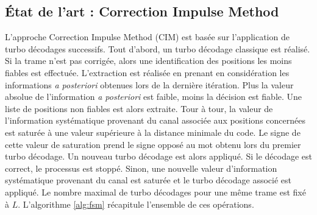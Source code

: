 \subsection{État de l'art : Correction Impulse Method}
L'approche Correction Impulse Method (CIM) est basée sur l'application de turbo décodages successifs. Tout d'abord, un turbo décodage 
classique est réalisé. Si la trame n'est pas corrigée, alors une identification des positions les moins fiables est effectuée. 
L'extraction est réalisée en prenant en considération les informations \textit{a posteriori} obtenues lors de la dernière 
itération. Plus la valeur absolue de l'information \textit{a posteriori} est faible, moins la décision est fiable. Une liste de positions non fiables est alors extraite. Tour à tour, la valeur de l'information systématique provenant du canal 
associée aux positions concernées est saturée à une valeur supérieure à la distance minimale du code. Le signe de cette 
valeur de saturation prend le signe opposé au mot obtenu lors du premier turbo décodage. Un nouveau turbo décodage est alors
appliqué. Si le décodage est correct, le processus est stoppé. Sinon, une nouvelle valeur d'information systématique provenant du canal est saturée
et le turbo décodage associé est appliqué. Le nombre maximal de turbo décodages pour une même trame est fixé à 
$L$. L'algorithme \ref{alg:fsm} récapitule l'ensemble de ces opérations.

